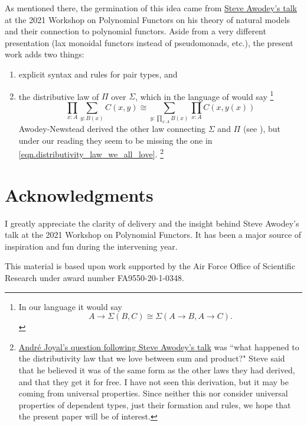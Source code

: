 \documentclass[11pt, one side, article]{memoir}
\theoremstyle{definition}
\theoremstyle{plain}
\newcommand{\0}{\textsf{0}}
\newcommand{\1}{\tn{\textsf{1}}}
\begin{document}
As mentioned there, the germination of this idea came from \href{https://www.youtube.com/watch?v=RDuNIP4icKI\&t=10765s}{Steve Awodey's talk} at the 2021 Workshop on Polynomial Functors on his theory of natural models and their connection to polynomial functors. Aside from a very different presentation (lax monoidal functors instead of pseudomonads, etc.), the present work adds two things:
\begin{enumerate}
	\item explicit syntax and rules for pair types, and
	\item the distributive law of $\Pi$ over $\Sigma$, which in the language of \cite{awodey2018polynomial} would say%
	\footnote{In our language it would say 
	\[
	A\to\Sigma(B,C)\cong \Sigma(A\to B,A\to C).
	\]
	}
	\begin{equation}\label{eqn.distributivity_law_we_all_love}
	\prod_{x:A}\sum_{y:B(x)}C(x,y)\cong\sum_{y:\prod_{x:A}B(x)}\prod_{x:A}C(x,y(x))
	\end{equation}
	Awodey-Newstead derived the other law connecting $\Sigma$ and $\Pi$ (see \cite[Remark 4.2]{awodey2018polynomial}), but under our reading they seem to be missing the one in \eqref{eqn.distributivity_law_we_all_love}.%
	\footnote{\href{https://youtu.be/RDuNIP4icKI?t=13898}{Andr\'{e} Joyal's question following Steve Awodey's talk} was ``what happened to the distributivity law that we love between sum and product?" Steve said that he believed it was of the same form as the other laws they had derived, and that they get it for free. I have not seen this derivation, but it may be coming from universal properties. Since neither this nor \cite{awodey2018polynomial} consider universal properties of dependent types, just their formation and rules, we hope that the present paper will be of interest.
	}
\end{enumerate}

\section{Acknowledgments}

I greatly appreciate the clarity of delivery and the insight behind Steve Awodey's talk at the 2021 Workshop on Polynomial Functors. It has been a major source of inspiration and fun during the intervening year.

This material is based upon work supported by the Air Force Office of Scientific Research under award number FA9550-20-1-0348.
\end{document}
